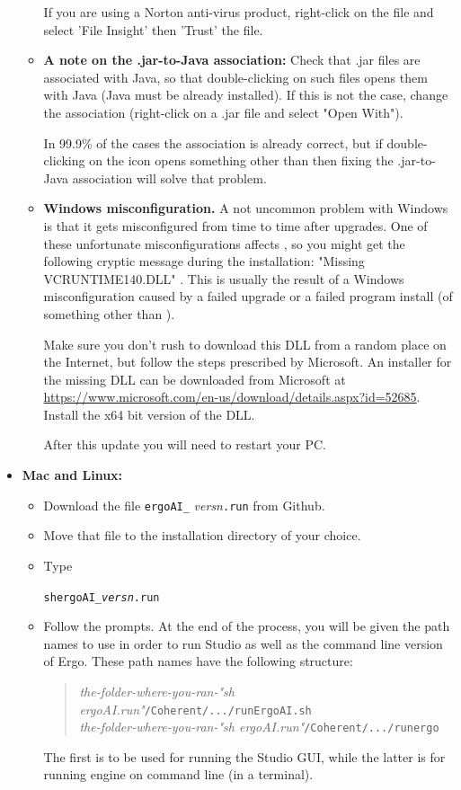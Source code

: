 \documentclass[11pt]{article}
\newcommand{\ERGO}{\mbox{\smaller{\ensuremath{\cal{E}}\smaller{{\sc{RGO}}}}}\xspace}
\newcommand{\ERGOAI}{\mbox{\smaller{\ensuremath{\cal{E}}\smaller{{\sc{RGO}}}\ensuremath{\cal{AI}}}}\xspace}
\begin{document}
\begin{itemize}
\begin{itemize}
    If you are using a Norton anti-virus product, right-click on the file
    and select 'File Insight' then 'Trust'
    the file.
  \item \textbf{A note on the .jar-to-Java association:} 
    Check that .jar files are
    associated with Java, so that double-clicking on such files opens them
    with Java (Java must be already installed). If this is not the case,
    change the association (right-click on a .jar file and select "Open
    With").

    In 99.9\% of the cases the association is already correct, but if
    double-clicking on the \ERGOAI icon opens something other than \ERGO then
    fixing the .jar-to-Java association will solve that problem.
  \item \textbf{Windows misconfiguration.}  A not uncommon problem with
    Windows is that it gets misconfigured from time to time after
    upgrades. One of these unfortunate misconfigurations affects \ERGO, so
    you might get the following cryptic message during the installation:
    "Missing VCRUNTIME140.DLL" .  This is usually the result of a Windows
    misconfiguration caused by a failed upgrade or a failed program install
    (of something other than \ERGOAI).

    Make sure you don't rush to download this DLL from a random place on
    the Internet, but follow the steps prescribed by Microsoft. An
    installer for the missing DLL can be downloaded from Microsoft at
    \url{https://www.microsoft.com/en-us/download/details.aspx?id=52685}. Install
    the x64 bit version of the DLL.

    After this update you will need to restart your PC.
  \end{itemize}
\item[] \textbf{Mac and Linux:}  
  \begin{itemize}
  \item  Download the file \texttt{ergoAI\_}\textnormal{\it
      \textit{versn}}\texttt{.run}  from Github.
  \item Move that file to the installation directory of your choice.
  \item Type
\begin{alltt}
    sh ergoAI\_\textnormal{\it{}versn}.run 
\end{alltt}
  \item Follow the prompts. At the end of the process, you will be given
    the path names to use in order to run \ERGOAI Studio as well as the
    command line version of Ergo. These path names have the following
    structure:
    \begin{quote}
      \emph{the-folder-where-you-ran-"sh ergoAI.run"}\texttt{/Coherent/.../runErgoAI.sh}\\
      \emph{the-folder-where-you-ran-"sh ergoAI.run"}\texttt{/Coherent/.../runergo}
    \end{quote}
    The first is to be used for running the \ERGOAI Studio GUI, while the
    latter is for running \ERGOAI engine on command line (in a terminal).


\end{itemize}
\end{itemize}
\end{document}
